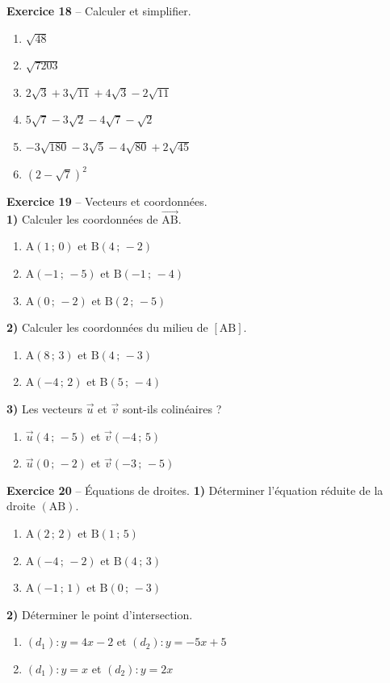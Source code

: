 \documentclass[12pt,a4paper,french]{article}
\begin{document}
\noindent\textbf{Exercice 18} -- Calculer et simplifier.
\begin{enumerate}
\item $\sqrt{48}$
\item $\sqrt{7203}$
\item $2\sqrt{3} + 3\sqrt{11} + 4\sqrt{3} - 2\sqrt{11}$
\item $5\sqrt{7} - 3\sqrt{2} - 4\sqrt{7} - \sqrt{2}$
\item $-3\sqrt{180} - 3\sqrt{5} - 4\sqrt{80} + 2\sqrt{45}$
\item $(2 - \sqrt{7})^2$
\end{enumerate}
\bigskip

\noindent\textbf{Exercice 19} -- Vecteurs et coordonnées.\\
\medskip
\noindent\textbf{1)} Calculer les coordonnées de $\overrightarrow{\ensuremath{\mathrm{A}}\ensuremath{\mathrm{B}}}$.
\begin{enumerate}
\item $\ensuremath{\mathrm{A}}(1\,;\,0)$ et $\ensuremath{\mathrm{B}}(4\,;\,-2)$
\item $\ensuremath{\mathrm{A}}(-1\,;\,-5)$ et $\ensuremath{\mathrm{B}}(-1\,;\,-4)$
\item $\ensuremath{\mathrm{A}}(0\,;\,-2)$ et $\ensuremath{\mathrm{B}}(2\,;\,-5)$
\end{enumerate}
\medskip
\noindent\textbf{2)} Calculer les coordonnées du milieu de $[\ensuremath{\mathrm{A}}\ensuremath{\mathrm{B}}]$.
\begin{enumerate}
\item $\ensuremath{\mathrm{A}}(8\,;\,3)$ et $\ensuremath{\mathrm{B}}(4\,;\,-3)$
\item $\ensuremath{\mathrm{A}}(-4\,;\,2)$ et $\ensuremath{\mathrm{B}}(5\,;\,-4)$
\end{enumerate}
\medskip
\noindent\textbf{3)} Les vecteurs $\vec{u}$ et $\vec{v}$ sont-ils colinéaires ?
\begin{enumerate}
\item $\vec{u}(4\,;\,-5)$ et $\vec{v}(-4\,;\,5)$
\item $\vec{u}(0\,;\,-2)$ et $\vec{v}(-3\,;\,-5)$
\end{enumerate}
\bigskip

\noindent\textbf{Exercice 20} -- Équations de droites.
\medskip
\noindent\textbf{1)} Déterminer l'équation réduite de la droite $(\ensuremath{\mathrm{A}}\ensuremath{\mathrm{B}})$.
\begin{enumerate}
\item $\ensuremath{\mathrm{A}}(2\,;\,2)$ et $\ensuremath{\mathrm{B}}(1\,;\,5)$
\item $\ensuremath{\mathrm{A}}(-4\,;\,-2)$ et $\ensuremath{\mathrm{B}}(4\,;\,3)$
\item $\ensuremath{\mathrm{A}}(-1\,;\,1)$ et $\ensuremath{\mathrm{B}}(0\,;\,-3)$
\end{enumerate}
\noindent\textbf{2)} Déterminer le point d'intersection.
\begin{enumerate}
\item $(d_1): y = 4x - 2$ et $(d_2): y = -5x + 5$
\item $(d_1): y = x$ et $(d_2): y = 2x$
\end{enumerate}
\bigskip
\end{document}
